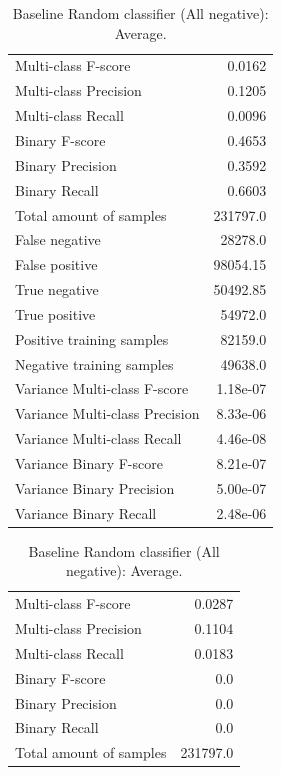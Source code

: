 \begin{table}[H]
\begin{minipage}{0.5\textwidth}
\caption{Baseline Random classifier (uniform): Average.}
\label{tab:baselinerandom}
\centering
\begin{tabular}{l r}
\toprule
Multi-class F-score & 0.0162 \\
Multi-class Precision & 0.1205 \\
Multi-class Recall & 0.0096 \\
\midrule
Binary F-score & 0.4653 \\
Binary Precision & 0.3592 \\
Binary Recall & 0.6603 \\
\midrule
Total amount of samples & 231797.0 \\
False negative & 28278.0 \\
False positive & 98054.15 \\
True negative & 50492.85 \\
True positive & 54972.0 \\
\midrule
Positive training samples & 82159.0 \\
Negative training samples & 49638.0 \\
\midrule
Variance Multi-class F-score & 1.18e-07 \\
Variance Multi-class Precision & 8.33e-06 \\
Variance Multi-class Recall & 4.46e-08 \\
\midrule
Variance Binary F-score & 8.21e-07 \\
Variance Binary Precision & 5.00e-07 \\
Variance Binary Recall & 2.48e-06 \\
\bottomrule
\end{tabular}
\end{minipage}
\begin{minipage}{0.5\textwidth}
\caption{Baseline Random classifier (All negative): Average.}
\label{tab:baselinepositive}
\centering
\begin{tabular}{l r}
\toprule
Multi-class F-score & 0.0287 \\
Multi-class Precision & 0.1104 \\
Multi-class Recall & 0.0183 \\
\midrule
Binary F-score & 0.0 \\
Binary Precision & 0.0 \\
Binary Recall & 0.0 \\
\midrule
Total amount of samples & 231797.0 \\

\end{tabular}
\end{minipage}
\end{table}
